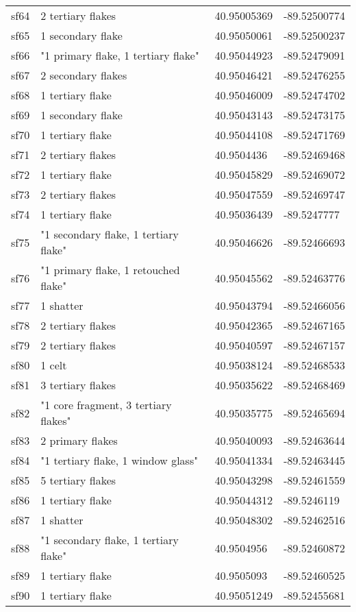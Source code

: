 \begin{longtable}{p{1cm}p{6cm}ll}
	sf64 & 2 tertiary flakes & 40.95005369 & -89.52500774\\
	sf65 & 1 secondary flake & 40.95050061 & -89.52500237\\
	sf66 & "1 primary flake, 1 tertiary flake" & 40.95044923 & -89.52479091\\
	sf67 & 2 secondary flakes & 40.95046421 & -89.52476255\\
	sf68 & 1 tertiary flake & 40.95046009 & -89.52474702\\
	sf69 & 1 secondary flake & 40.95043143 & -89.52473175\\
	sf70 & 1 tertiary flake & 40.95044108 & -89.52471769\\
	sf71 & 2 tertiary flakes & 40.9504436 & -89.52469468\\
	sf72 & 1 tertiary flake & 40.95045829 & -89.52469072\\
	sf73 & 2 tertiary flakes & 40.95047559 & -89.52469747\\
	sf74 & 1 tertiary flake & 40.95036439 & -89.5247777\\
	sf75 & "1 secondary flake, 1 tertiary flake" & 40.95046626 & -89.52466693\\
	sf76 & "1 primary flake, 1 retouched flake" & 40.95045562 & -89.52463776\\
	sf77 & 1 shatter & 40.95043794 & -89.52466056\\
	sf78 & 2 tertiary flakes & 40.95042365 & -89.52467165\\
	sf79 & 2 tertiary flakes & 40.95040597 & -89.52467157\\
	sf80 & 1 celt & 40.95038124 & -89.52468533\\
	sf81 & 3 tertiary flakes & 40.95035622 & -89.52468469\\
	sf82 & "1 core fragment, 3 tertiary flakes" & 40.95035775 & -89.52465694\\
	sf83 & 2 primary flakes & 40.95040093 & -89.52463644\\
	sf84 & "1 tertiary flake, 1 window glass" & 40.95041334 & -89.52463445\\
	sf85 & 5 tertiary flakes & 40.95043298 & -89.52461559\\
	sf86 & 1 tertiary flake & 40.95044312 & -89.5246119\\
	sf87 & 1 shatter & 40.95048302 & -89.52462516\\
	sf88 & "1 secondary flake, 1 tertiary flake" & 40.9504956 & -89.52460872\\
	sf89 & 1 tertiary flake & 40.9505093 & -89.52460525\\
	sf90 & 1 tertiary flake & 40.95051249 & -89.52455681\\

\end{longtable}
